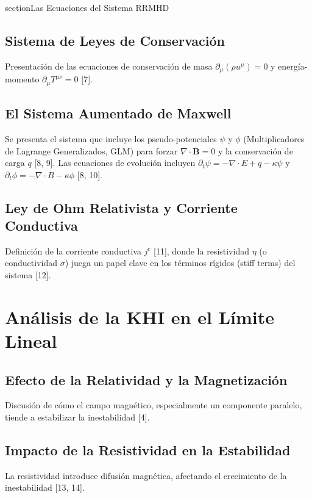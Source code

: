 section{Las Ecuaciones del Sistema RRMHD}
    \subsection{Sistema de Leyes de Conservación}
        Presentación de las ecuaciones de conservación de masa $\partial_\mu(\rho u^\mu)=0$ y energía-momento $\partial_\mu T^{\mu\nu}=0$ [7].
    \subsection{El Sistema Aumentado de Maxwell}
        Se presenta el sistema que incluye los pseudo-potenciales $\psi$ y $\phi$ (Multiplicadores de Lagrange Generalizados, GLM) para forzar $\nabla \cdot \mathbf{B}=0$ y la conservación de carga $q$ [8, 9]. Las ecuaciones de evolución incluyen $\partial_t \psi = -\nabla \cdot E + q - \kappa \psi$ y $\partial_t \phi = -\nabla \cdot B - \kappa \phi$ [8, 10].
    \subsection{Ley de Ohm Relativista y Corriente Conductiva}
        Definición de la corriente conductiva $j^c$ [11], donde la resistividad $\eta$ (o conductividad $\sigma$) juega un papel clave en los términos rígidos (stiff terms) del sistema [12].

\section{Análisis de la KHI en el Límite Lineal}
    \subsection{Efecto de la Relatividad y la Magnetización}
        Discusión de cómo el campo magnético, especialmente un componente paralelo, tiende a estabilizar la inestabilidad [4].
    \subsection{Impacto de la Resistividad en la Estabilidad}
        La resistividad introduce difusión magnética, afectando el crecimiento de la inestabilidad [13, 14].
